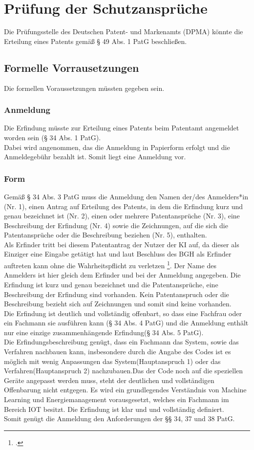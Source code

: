\section{Prüfung der Schutzansprüche}
Die Prüfungsstelle des Deutschen Patent- und Markenamts (DPMA) könnte die Erteilung eines
Patents gemäß § 49 Abs. 1 PatG beschließen.
\subsection{Formelle Vorrausetzungen}
Die formellen Voraussetzungen müssten gegeben sein.
\subsubsection{Anmeldung}
Die Erfindung müsste zur Erteilung eines Patents beim Patentamt angemeldet worden sein (§ 34 Abs.
1 PatG).
\\
Dabei wird angenommen,
das die Anmeldung in Papierform erfolgt und die Anmeldegebühr bezahlt ist. 
Somit liegt eine Anmeldung vor.
\subsubsection{Form}
Gemäß § 34 Abs. 3 PatG muss die Anmeldung den Namen der/des Anmelders*in (Nr. 1), einen
Antrag auf Erteilung des Patents, in dem die Erfindung kurz und genau bezeichnet ist (Nr. 2), einen
oder mehrere Patentansprüche (Nr. 3), eine Beschreibung der Erfindung (Nr. 4) sowie die
Zeichnungen, auf die sich die Patentansprüche oder die Beschreibung beziehen (Nr. 5), enthalten.
\\
Als Erfinder tritt bei diesem Patentantrag der Nutzer der
KI auf, da dieser als Einziger eine Eingabe getätigt hat und
laut Beschluss des BGH als Erfinder auftreten kann ohne die Wahrheitspflicht
zu verletzen \footcite{BPatG21122021}. 
Der Name des Anmelders ist hier gleich dem Erfinder und bei der
Anmeldung angegeben. 
Die Erfindung ist kurz und genau bezeichnet und die Patentansprüche, 
eine Beschreibung der Erfindung
sind vorhanden. 
Kein Patentanspruch oder die Beschreibung bezieht sich auf Zeichnungen
und somit sind keine vorhanden.
\\
Die Erfindung ist deutlich und vollständig offenbart, 
so dass eine Fachfrau
oder ein Fachmann sie ausführen kann (§ 34 Abs. 4 PatG) und die
Anmeldung enthält nur eine einzige zusammenhängende Erfindung(§ 34 Abs. 5 PatG). 
\\
Die Erfindungsbeschreibung genügt, dass ein Fachmann das System, sowie 
das Verfahren nachbauen kann, insbesondere durch die Angabe des Codes
ist es möglich mit wenig Anpassungen das System(Hauptanspruch 1) oder
das Verfahren(Hauptanspruch 2) nachzubauen.Das der Code noch auf die speziellen
Geräte angepasst werden muss, steht der deutlichen und vollständigen
Offenbarung nicht entgegen. Es wird ein grundlegendes
Verständnis von Machine Learning und Energiemanagement vorausgesetzt,
welches ein Fachmann im Bereich IOT besitzt. Die Erfindung ist klar und
und vollständig definiert.
\\
Somit genügt die Anmeldung den Anforderungen der §§ 34, 37 und 38 PatG.
